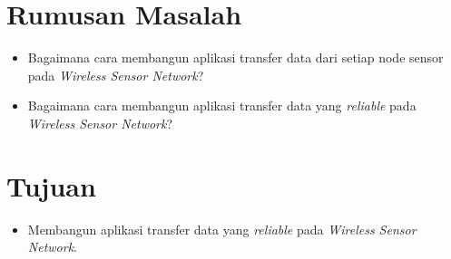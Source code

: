 \documentclass[a4paper,twoside]{article}
\begin{document}
\section{Rumusan Masalah}
\begin{itemize}
	\item Bagaimana cara membangun aplikasi transfer data dari setiap node sensor pada \textit{Wireless Sensor Network}?
	\item Bagaimana cara membangun aplikasi transfer data yang \textit{reliable} pada \textit{Wireless Sensor Network}?
\end{itemize}

\section{Tujuan}
\begin{itemize}
 	\item Membangun aplikasi transfer data yang \textit{reliable} pada \textit{Wireless Sensor Network}.
\end{itemize}	
\end{document}
